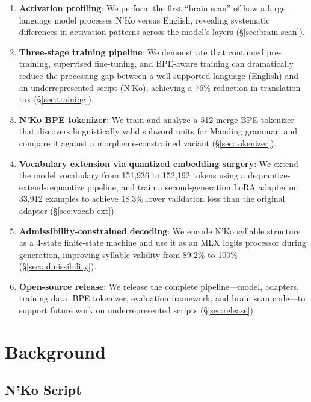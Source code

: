 \documentclass[11pt]{article}
\begin{document}
\begin{enumerate}
\item \textbf{Activation profiling}: We perform the first ``brain scan'' of how a large language model processes N'Ko versus English, revealing systematic differences in activation patterns across the model's layers (\S\ref{sec:brain-scan}).

\item \textbf{Three-stage training pipeline}: We demonstrate that continued pre-training, supervised fine-tuning, and BPE-aware training can dramatically reduce the processing gap between a well-supported language (English) and an underrepresented script (N'Ko), achieving a 76\% reduction in translation tax (\S\ref{sec:training}).

\item \textbf{N'Ko BPE tokenizer}: We train and analyze a 512-merge BPE tokenizer that discovers linguistically valid subword units for Manding grammar, and compare it against a morpheme-constrained variant (\S\ref{sec:tokenizer}).

\item \textbf{Vocabulary extension via quantized embedding surgery}: We extend the model vocabulary from 151,936 to 152,192 tokens using a dequantize-extend-requantize pipeline, and train a second-generation LoRA adapter on 33,912 examples to achieve 18.3\% lower validation loss than the original adapter (\S\ref{sec:vocab-ext}).

\item \textbf{Admissibility-constrained decoding}: We encode N'Ko syllable structure as a 4-state finite-state machine and use it as an MLX logits processor during generation, improving syllable validity from 89.2\% to 100\% (\S\ref{sec:admissibility}).

\item \textbf{Open-source release}: We release the complete pipeline---model, adapters, training data, BPE tokenizer, evaluation framework, and brain scan code---to support future work on underrepresented scripts (\S\ref{sec:release}).
\end{enumerate}

\section{Background}

\subsection{N'Ko Script}
\end{document}
